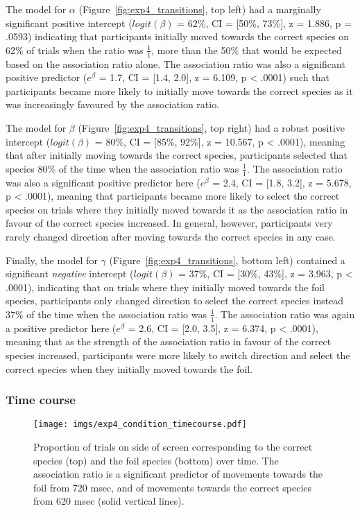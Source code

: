 The model for $\alpha$ (Figure~\ref{fig:exp4_transitions}, top left)
had a marginally significant positive intercept
($logit(\beta)$ = 62\%, CI = [50\%, 73\%], z = 1.886, p = .0593)
indicating that participants initially moved towards the correct species
on 62\% of trials when the ratio was $\frac{1}{1}$,
more than the 50\% that would be expected 
based on the association ratio alone.
The association ratio was also a significant positive predictor
($e^{\beta}$ = 1.7, CI = [1.4, 2.0], z = 6.109, p < .0001)
such that participants became more likely to initially move
towards the correct species as it was increasingly favoured by the association ratio.

The model for $\beta$  (Figure~\ref{fig:exp4_transitions}, top right)
had a robust positive intercept
($logit(\beta)$ = 80\%, CI = [85\%, 92\%], z = 10.567, p < .0001),
meaning that after initially moving towards the correct species,
participants selected that species 80\% of the time
when the association ratio was $\frac{1}{1}$.
The association ratio was also a significant positive predictor here
($e^{\beta}$ = 2.4, CI = [1.8, 3.2], z = 5.678, p < .0001),
meaning that participants became more likely to select the correct species
on trials where they initially moved towards it
as the association ratio in favour of the correct species increased.
In general, however, participants very rarely
changed direction after moving towards the correct species
in any case.

Finally, the model for $\gamma$  (Figure~\ref{fig:exp4_transitions}, bottom left)
contained a significant \emph{negative} intercept
($logit(\beta)$ = 37\%, CI = [30\%, 43\%], z = 3.963, p < .0001),
indicating that on trials where they initially moved towards the foil species,
participants only changed direction to select the correct species instead
37\% of the time when the association ratio was $\frac{1}{1}$.
The association ratio was again a positive predictor here
($e^{\beta}$ = 2.6, CI = [2.0, 3.5], z = 6.374, p < .0001),
meaning that as the strength of the association ratio
in favour of the correct species increased,
participants were more likely to switch direction
and select the correct species when they initially moved towards the foil.


\subsubsection{Time course}
\FloatBarrier

\begin{figure}[ht]
  \centering
  \texttt{[image: imgs/exp4\_condition\_timecourse.pdf]}
  \caption[Time course, separately for each response option, in Experiment 4.]{
    Proportion of trials on side of screen corresponding to the correct species (top)
    and the foil species (bottom) over time.
    The association ratio is a significant predictor
    of movements towards the foil from 720 msec,
    and of movements towards the correct species from 620 msec (solid vertical lines).
    \label{fig:exp4_condition_timecourse} }
\end{figure}


